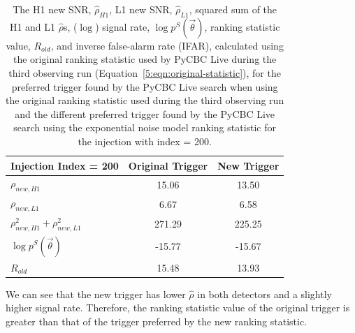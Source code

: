 %
\begin{table}[ht]
    \centering
    \begin{tabular}{lcc}
        \toprule
        \textbf{Injection Index = 200} & \textbf{Original Trigger} & \textbf{New Trigger} \\
        \midrule
        $\rho_{new, H1}$  & 15.06 & 13.50 \\
        $\rho_{new, L1}$   & 6.67 & 6.58 \\
        $\rho_{new, H1}^2 + \rho_{new, L1}^2$   & 271.29 & 225.25 \\
        $\log p^{S}(\Vec{\theta})$ & -15.77 & -15.67 \\
        $R_{old}$ & 15.48 & 13.93 \\
        \bottomrule
    \end{tabular}
    \caption{The H1 new SNR, $\hat{\rho}_{H1}$, L1 new SNR, $\hat{\rho}_{L1}$, squared sum of the H1 and L1 $\hat{\rho}$s, ($\log$) signal rate, $\log p^{S}(\Vec{\theta})$, ranking statistic value, $R_{old}$, and inverse false-alarm rate (IFAR), calculated using the original ranking statistic used by PyCBC Live during the third observing run (Equation~\ref{5:eqn:original-statistic}), for the preferred trigger found by the PyCBC Live search when using the original ranking statistic used during the third observing run and the different preferred trigger found by the PyCBC Live search using the exponential noise model ranking statistic for the injection with index = 200.}
    \label{5:tab:200-old-stat}
\end{table}
%
We can see that the new trigger has lower $\hat{\rho}$ in both detectors and a slightly higher signal rate. Therefore, the ranking statistic value of the original trigger is greater than that of the trigger preferred by the new ranking statistic.

